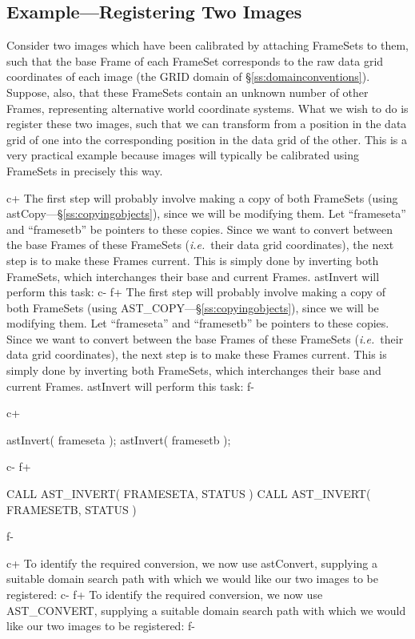 \documentclass[twoside,11pt]{starlink}
\providecommand{\secref}[1]{\S\ref{#1}}
\begin{document}
{\subsection{\label{ss:registeringimages}Example---Registering Two Images}

Consider two images which have been calibrated by attaching FrameSets
to them, such that the base Frame of each FrameSet corresponds to the
raw data grid coordinates of each image (the GRID domain of
\secref{ss:domainconventions}). Suppose, also, that these FrameSets
contain an unknown number of other Frames, representing alternative
world coordinate systems.  What we wish to do is register these two
images, such that we can transform from a position in the data grid of
one into the corresponding position in the data grid of the other.
This is a very practical example because images will typically be
calibrated using FrameSets in precisely this way.

c+
The first step will probably involve making a copy of both FrameSets
(using astCopy---\secref{ss:copyingobjects}), since we will be
modifying them. Let ``frameseta'' and ``framesetb'' be pointers to
these copies. Since we want to convert between the base Frames of
these FrameSets (\emph{i.e.}\ their data grid coordinates), the next
step is to make these Frames current. This is simply done by inverting
both FrameSets, which interchanges their base and current
Frames. astInvert will perform this task:
c-
f+
The first step will probably involve making a copy of both FrameSets
(using AST\_COPY---\secref{ss:copyingobjects}), since we will be
modifying them. Let ``frameseta'' and ``framesetb'' be pointers to
these copies. Since we want to convert between the base Frames of
these FrameSets (\emph{i.e.}\ their data grid coordinates), the next
step is to make these Frames current. This is simply done by inverting
both FrameSets, which interchanges their base and current
Frames. astInvert will perform this task:
f-

c+
\small
\begin{terminalv}
astInvert( frameseta );
astInvert( framesetb );
\end{terminalv}
\normalsize
c-
f+
\small
\begin{terminalv}
      CALL AST_INVERT( FRAMESETA, STATUS )
      CALL AST_INVERT( FRAMESETB, STATUS )
\end{terminalv}
\normalsize
f-

c+
To identify the required conversion, we now use astConvert, supplying
a suitable domain search path with which we would like our two images
to be registered:
c-
f+
To identify the required conversion, we now use AST\_CONVERT,
supplying a suitable domain search path with which we would like our
two images to be registered:
f-

}
\end{document}
